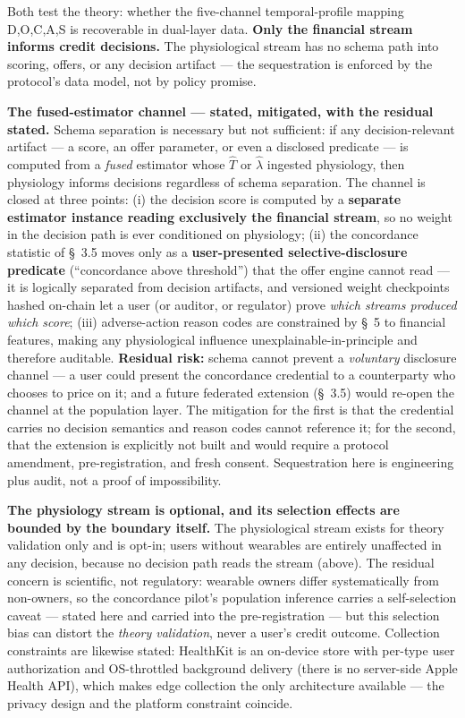 \documentclass[
]{article}
\begin{document}
Both test the theory: whether the five-channel temporal-profile mapping
D,O,C,A,S is recoverable in dual-layer data. \textbf{Only the financial
stream informs credit decisions.} The physiological stream has no schema
path into scoring, offers, or any decision artifact --- the
sequestration is enforced by the protocol's data model, not by policy
promise.

\textbf{The fused-estimator channel --- stated, mitigated, with the
residual stated.} Schema separation is necessary but not sufficient: if
any decision-relevant artifact --- a score, an offer parameter, or even
a disclosed predicate --- is computed from a \emph{fused} estimator
whose \(\hat{T}\) or \(\hat{\lambda}\) ingested physiology, then
physiology informs decisions regardless of schema separation. The
channel is closed at three points: (i) the decision score is computed by
a \textbf{separate estimator instance reading exclusively the financial
stream}, so no weight in the decision path is ever conditioned on
physiology; (ii) the concordance statistic of §~3.5 moves only as a
\textbf{user-presented selective-disclosure predicate} (``concordance
above threshold'') that the offer engine cannot read --- it is logically
separated from decision artifacts, and versioned weight checkpoints
hashed on-chain let a user (or auditor, or regulator) prove \emph{which
streams produced which score}; (iii) adverse-action reason codes are
constrained by §~5 to financial features, making any physiological
influence unexplainable-in-principle and therefore auditable.
\textbf{Residual risk:} schema cannot prevent a \emph{voluntary}
disclosure channel --- a user could present the concordance credential
to a counterparty who chooses to price on it; and a future federated
extension (§~3.5) would re-open the channel at the population layer. The
mitigation for the first is that the credential carries no decision
semantics and reason codes cannot reference it; for the second, that the
extension is explicitly not built and would require a protocol
amendment, pre-registration, and fresh consent. Sequestration here is
engineering plus audit, not a proof of impossibility.

\textbf{The physiology stream is optional, and its selection effects are
bounded by the boundary itself.} The physiological stream exists for
theory validation only and is opt-in; users without wearables are
entirely unaffected in any decision, because no decision path reads the
stream (above). The residual concern is scientific, not regulatory:
wearable owners differ systematically from non-owners, so the
concordance pilot's population inference carries a self-selection caveat
--- stated here and carried into the pre-registration --- but this
selection bias can distort the \emph{theory validation}, never a user's
credit outcome. Collection constraints are likewise stated: HealthKit is
an on-device store with per-type user authorization and OS-throttled
background delivery (there is no server-side Apple Health API), which
makes edge collection the only architecture available --- the privacy
design and the platform constraint coincide.
\end{document}
